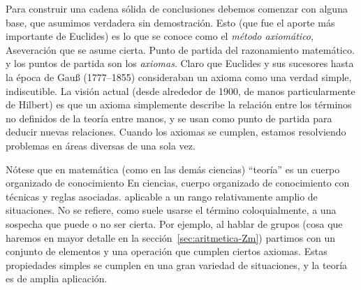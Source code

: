   Para construir una cadena sólida de conclusiones
  debemos comenzar con alguna base,
  que asumimos verdadera sin demostración.
  Esto
  (que fue el aporte más importante de Euclides)%
  es lo que se conoce como el \emph{método axiomático},%
	     {Aseveración que se asume cierta.
	      Punto de partida del razonamiento matemático.}
  y los puntos de partida son los \emph{axiomas}.
  Claro que Euclides%
  y sus sucesores hasta la época de Gauß
  (1777--1855)%
  consideraban un axioma como una verdad simple,
  indiscutible.
  La visión actual
  (desde alrededor de 1900,
   de manos particularmente de Hilbert)%
  es que un axioma
  simplemente describe la relación entre los términos no definidos
  de la teoría entre manos,
  y se usan como punto de partida para deducir nuevas relaciones.
  Cuando los axiomas se cumplen,
  estamos resolviendo problemas en áreas diversas de una sola vez.

  Nótese que en matemática
  (como en las demás ciencias)
  ``teoría'' es un cuerpo organizado de conocimiento%
	     {En ciencias, cuerpo organizado de conocimiento
	      con técnicas y reglas asociadas.}
  aplicable a un rango relativamente amplio de situaciones.
  No se refiere,
  como suele usarse el término coloquialmente,
  a una sospecha que puede o no ser cierta.
  Por ejemplo,
  al hablar de grupos%
  (cosa que haremos en mayor detalle
   en la sección~\ref{sec:aritmetica-Zm})
  partimos con un conjunto de elementos y una operación
  que cumplen ciertos axiomas.
  Estas propiedades simples se cumplen
  en una gran variedad de situaciones,
  y la teoría es de amplia aplicación.

